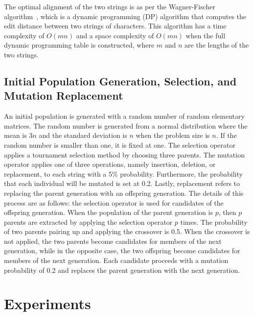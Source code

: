 The optimal alignment of the two strings is as per the Wagner-Fischer algorithm~\cite{wagner1974string}, which is a dynamic programming (DP) algorithm that computes the edit distance between two strings of characters. This algorithm has a time complexity of $ O\left(mn\right) $ and a space complexity of $ O\left(mn\right) $ when the full dynamic programming table is constructed, where $ m $ and $ n $ are the lengths of the two strings.

\subsection{Initial Population Generation, Selection, and Mutation Replacement}
An initial population is generated with a random number of random elementary matrices. The random number is generated from a normal distribution where the mean is $ 3n $ and the standard deviation is $ n $ when the problem size is $ n $. If the random number is smaller than one, it is fixed at one. The selection operator applies a tournament selection method by choosing three parents. The mutation operator applies one of three operations, namely insertion, deletion, or replacement, to each string with a 5\% probability. Furthermore, the probability that each individual will be mutated is set at 0.2. Lastly, replacement refers to replacing the parent generation with an offspring generation. The details of this process are as follows: the selection operator is used for candidates of the offspring generation. When the population of the parent generation is $ p $, then $ p $ parents are extracted by applying the selection operator $ p $ times. The probability of two parents pairing up and applying the crossover is 0.5. When the crossover is not applied, the two parents become candidates for members of the next generation, while in the opposite case, the two offspring become candidates for members of the next generation. Each candidate proceeds with a mutation probability of 0.2 and replaces the parent generation with the next generation.


\section{Experiments} \label{sec6:experiments}

